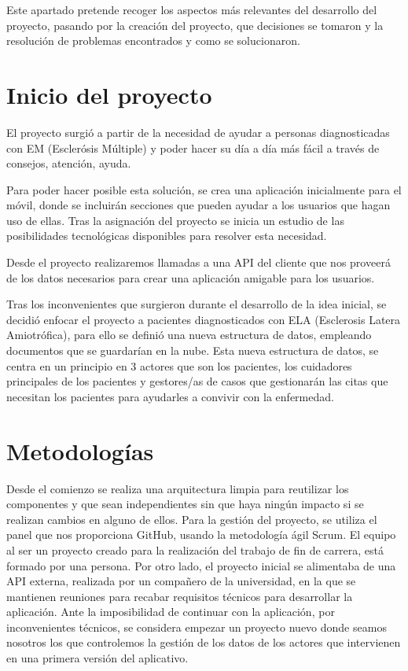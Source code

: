 
Este apartado pretende recoger los aspectos más relevantes del desarrollo del proyecto, pasando por la creación del proyecto, que decisiones se tomaron y la resolución de 
problemas encontrados y como se solucionaron.

\section{Inicio del proyecto}
El proyecto surgió a partir de la necesidad de ayudar a personas diagnosticadas con EM (Esclerósis Múltiple) y poder hacer su día a día más fácil a través de consejos, atención, ayuda.

Para poder hacer posible esta solución, se crea una aplicación inicialmente para el móvil, donde se incluirán secciones que pueden ayudar a los usuarios que hagan uso de ellas. Tras la asignación del proyecto se inicia un estudio de las posibilidades tecnológicas disponibles para resolver esta necesidad.

Desde el proyecto realizaremos llamadas a una API del cliente que nos proveerá de los datos necesarios para crear una aplicación amigable para los usuarios.

Tras los inconvenientes que surgieron durante el desarrollo de la idea inicial, se decidió enfocar el proyecto a pacientes diagnosticados con ELA (Esclerosis Latera Amiotrófica), para ello se definió una nueva estructura de datos, empleando documentos que se guardarían en la nube. Esta nueva estructura de datos, se centra en un principio en 3 actores que son los pacientes, los cuidadores principales de los pacientes y gestores/as de casos que gestionarán las citas que necesitan los pacientes para ayudarles a convivir con la enfermedad.

\section{Metodologías}
Desde el comienzo se realiza una arquitectura limpia para reutilizar los componentes y que sean independientes sin que haya ningún impacto si se realizan cambios en alguno de ellos.
Para la gestión del proyecto, se utiliza el panel que nos proporciona GitHub, usando la metodología ágil Scrum. El equipo al ser un proyecto creado para la realización del trabajo de fin de carrera, está formado por una persona. 
Por otro lado, el proyecto inicial se alimentaba de una API externa, realizada por un compañero de la universidad, en la que se mantienen reuniones para recabar requisitos técnicos para desarrollar la aplicación. Ante la imposibilidad de continuar con la aplicación, por inconvenientes técnicos, se considera empezar un proyecto nuevo donde seamos nosotros los que controlemos la gestión de los datos de los actores que intervienen en una primera versión del aplicativo.

